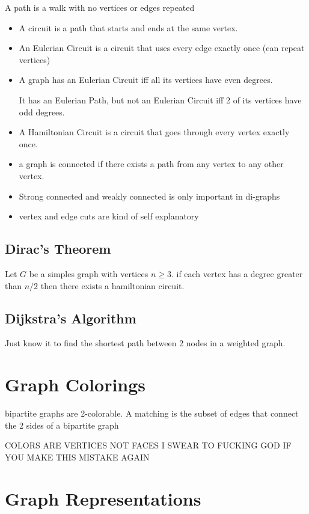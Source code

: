 \documentclass{report}
\begin{document}
A path is a walk with no vertices or edges repeated
\begin{itemize}
\item
A circuit is a path that starts and ends at the same vertex.
\item
An Eulerian Circuit is a circuit that uses every edge exactly once (can repeat vertices)
\item
A graph has an Eulerian Circuit iff all its vertices have even degrees.

It has an Eulerian Path, but not an Eulerian Circuit iff 2 of its vertices have odd degrees.
\item
A Hamiltonian Circuit is a circuit that goes through every vertex exactly once.
\item
a graph is connected if there exists a path from any vertex to any other vertex.
\item
Strong connected and weakly connected is only important in di-graphs
\item
vertex and edge cuts are kind of self explanatory

\end{itemize}

\subsection{Dirac's Theorem}
Let $G$ be a simples graph with vertices $n \geq 3$. if each vertex has a degree greater than $n/2$ then there exists a hamiltonian circuit.

\subsection{Dijkstra's Algorithm}
Just know it to find the shortest path between 2 nodes in a weighted graph.

\section{Graph Colorings}
bipartite graphs are 2-colorable. A matching is the subset of edges that connect the 2 sides of a bipartite graph

COLORS ARE VERTICES NOT FACES I SWEAR TO FUCKING GOD IF YOU MAKE THIS MISTAKE AGAIN




\section{Graph Representations}
\end{document}
